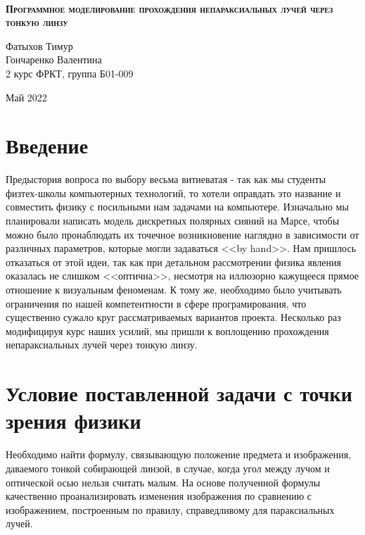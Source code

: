 \documentclass[a4paper,12pt]{article} %
\begin{document}

\begin{titlepage}
\begin{center}
\
\vfill

{\LARGE \textsc{\textbf{Программное моделирование прохождения непараксиальных лучей через тонкую линзу\\}}}

\vspace{2em}

Фатыхов Тимур\\ Гончаренко Валентина\\2 курс ФРКТ, группа Б01-009

\vfill

Май 2022
\end{center}
\end{titlepage}


\newpage
\tableofcontents{} %
\newpage


\section{Введение}

Предыстория вопроса по выбору весьма витиеватая - так как мы студенты физтех-школы компьютерных технологий, то хотели оправдать это название и совместить физику с посильными нам задачами на компьютере. Изначально мы планировали написать модель дискретных полярных сияний на Марсе, чтобы можно было пронаблюдать их точечное возникновение наглядно в зависимости от различных параметров, которые могли задаваться <<by hand>>. Нам пришлось отказаться от этой идеи, так как при детальном рассмотрении физика явления оказалась не слишком <<оптична>>, несмотря на иллюзорно кажущееся прямое отношение к визуальным феноменам. К тому же, необходимо было учитывать ограничения по нашей компетентности в сфере програмирования, что существенно сужало круг рассматриваемых вариантов проекта. Несколько раз модифицируя курс наших усилий, мы пришли к воплощению прохождения непараксиальных лучей через тонкую линзу.

\newpage

\section{Условие поставленной задачи с точки зрения физики}
Необходимо найти формулу, связывающую положение предмета и изображения, даваемого тонкой собирающей линзой, в случае, когда угол между лучом и оптической осью нельзя считать малым. На основе полученной формулы качественно проанализировать изменения изображения по сравнению с изображением, построенным по правилу, справедливому для параксиальных лучей.
\end{document}

